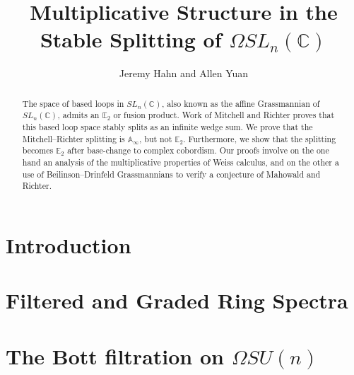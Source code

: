 \documentclass[reqno, oneside]{amsart}
\theoremstyle{definition}
\theoremstyle{plain}
\begin{document}
\title{Multiplicative Structure in the Stable Splitting of $\Omega SL_n(\mathbb{C})$}
\author{Jeremy Hahn and Allen Yuan}

\begin{abstract}
The space of based loops in $SL_n(\mathbb{C})$, also known as the affine Grassmannian of $SL_n(\mathbb{C})$, admits an $\mathbb{E}_2$ or fusion product.  Work of Mitchell and Richter proves that this based loop space stably splits as an infinite wedge sum.  We prove that the Mitchell--Richter splitting is $\mathbb{A}_\infty$, but not $\mathbb{E}_2$.  Furthermore, we show that the splitting becomes $\mathbb{E}_2$ after base-change to complex cobordism.  Our proofs involve on the one hand an analysis of the multiplicative properties of Weiss calculus, and on the other a use of Beilinson--Drinfeld Grassmannians to verify a conjecture of Mahowald and Richter.
\end{abstract}





\setcounter{tocdepth}{1}
\maketitle

\tableofcontents



\section{Introduction}



\section{Filtered and Graded Ring Spectra} \label{sec:FilGra}



\section{The Bott filtration on \texorpdfstring{$\Omega SU(n)$}{OmegaSU(n)}} \label{sec:MRFil}

 
\end{document}
